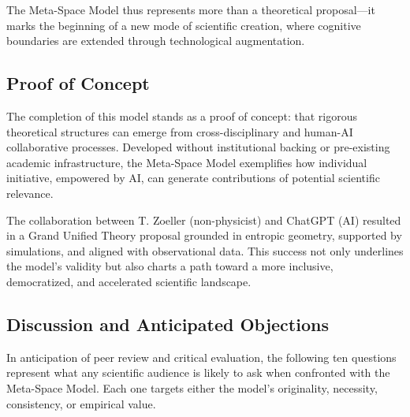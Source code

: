 \documentclass[10.5pt,a4paper]{article}
\begin{document}
The Meta-Space Model thus represents more than a theoretical proposal—it marks the beginning of a new mode of scientific creation, where cognitive boundaries are extended through technological augmentation.

\subsection{Proof of Concept}

The completion of this model stands as a proof of concept: that rigorous theoretical structures can emerge from cross-disciplinary and human-AI collaborative processes. Developed without institutional backing or pre-existing academic infrastructure, the Meta-Space Model exemplifies how individual initiative, empowered by AI, can generate contributions of potential scientific relevance.

The collaboration between T. Zoeller (non-physicist) and ChatGPT (AI) resulted in a Grand Unified Theory proposal grounded in entropic geometry, supported by simulations, and aligned with observational data. This success not only underlines the model’s validity but also charts a path toward a more inclusive, democratized, and accelerated scientific landscape.

\subsection{Discussion and Anticipated Objections}

In anticipation of peer review and critical evaluation, the following ten questions represent what any scientific audience is likely to ask when confronted with the Meta-Space Model. Each one targets either the model’s originality, necessity, consistency, or empirical value.
\end{document}
